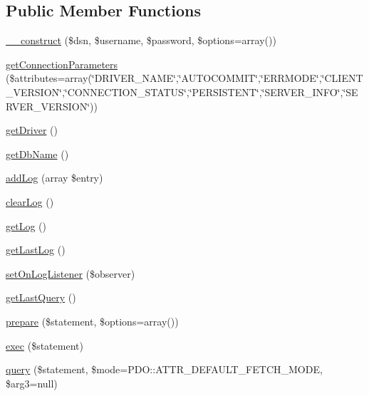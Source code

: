 \subsection*{Public Member Functions}
\begin{DoxyCompactItemize}
\item 
\hyperlink{classTk_1_1Db_1_1Pdo_a3edd9e08ac909d30c3b131873e9c38c5}{\+\_\+\+\_\+construct} (\$dsn, \$username, \$password, \$options=array())
\item 
\hyperlink{classTk_1_1Db_1_1Pdo_abe915b7e9ee07e05d43ee0ae6c3a50f8}{get\+Connection\+Parameters} (\$attributes=array(\char`\"{}D\+R\+I\+V\+E\+R\+\_\+\+N\+A\+M\+E\char`\"{},\char`\"{}A\+U\+T\+O\+C\+O\+M\+M\+I\+T\char`\"{},\char`\"{}E\+R\+R\+M\+O\+D\+E\char`\"{},\char`\"{}C\+L\+I\+E\+N\+T\+\_\+\+V\+E\+R\+S\+I\+O\+N\char`\"{},\char`\"{}C\+O\+N\+N\+E\+C\+T\+I\+O\+N\+\_\+\+S\+T\+A\+T\+U\+S\char`\"{},\char`\"{}P\+E\+R\+S\+I\+S\+T\+E\+N\+T\char`\"{},\char`\"{}S\+E\+R\+V\+E\+R\+\_\+\+I\+N\+F\+O\char`\"{},\char`\"{}S\+E\+R\+V\+E\+R\+\_\+\+V\+E\+R\+S\+I\+O\+N\char`\"{}))
\item 
\hyperlink{classTk_1_1Db_1_1Pdo_a4bac58529ac5162e17ae3749e084142f}{get\+Driver} ()
\item 
\hyperlink{classTk_1_1Db_1_1Pdo_a7978b7d17946696da3c329856e3cfbcc}{get\+Db\+Name} ()
\item 
\hyperlink{classTk_1_1Db_1_1Pdo_ac572c7a2e1a28147b5b58813efb7da49}{add\+Log} (array \$entry)
\item 
\hyperlink{classTk_1_1Db_1_1Pdo_ab2db3b6c051ed8008c119c061d3d7a14}{clear\+Log} ()
\item 
\hyperlink{classTk_1_1Db_1_1Pdo_a09ba25b18fdb145a3c01f6dc060e6854}{get\+Log} ()
\item 
\hyperlink{classTk_1_1Db_1_1Pdo_a9d4e579d79580f71684a148a0a9d3de5}{get\+Last\+Log} ()
\item 
\hyperlink{classTk_1_1Db_1_1Pdo_a90a26366d2da3a0f8abc976202c1b402}{set\+On\+Log\+Listener} (\$observer)
\item 
\hyperlink{classTk_1_1Db_1_1Pdo_a8ec0c595ea1c625a2d1c2506fb259302}{get\+Last\+Query} ()
\item 
\hyperlink{classTk_1_1Db_1_1Pdo_ac9fd6f10e3b0c74f101cc3d4e920416a}{prepare} (\$statement, \$options=array())
\item 
\hyperlink{classTk_1_1Db_1_1Pdo_ac5be696986bd89117158b059300317aa}{exec} (\$statement)
\item 
\hyperlink{classTk_1_1Db_1_1Pdo_aeddda4be5de764202c7ad31a8d5e9807}{query} (\$statement, \$mode=P\+D\+O\+::\+A\+T\+T\+R\+\_\+\+D\+E\+F\+A\+U\+L\+T\+\_\+\+F\+E\+T\+C\+H\+\_\+\+M\+O\+D\+E, \$arg3=null)

\end{DoxyCompactItemize}
